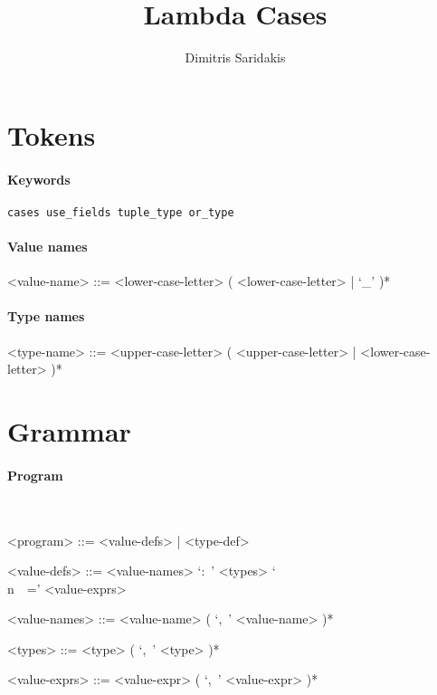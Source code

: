 \documentclass{article}
\date{}
\author{
  Dimitris Saridakis
}
\begin{document}
\title{
\textbf{Lambda Cases}
}
\maketitle

\section{Tokens}

\paragraph{Keywords}

\begin{verbatim}
cases use_fields tuple_type or_type
\end{verbatim}

\paragraph{Value names}

\begin{grammar}
<value-name> ::= 
<lower-case-letter> ( <lower-case-letter> | `_' )*
\end{grammar}

\paragraph{Type names}

\begin{grammar}
<type-name> ::= 
<upper-case-letter> ( <upper-case-letter> | <lower-case-letter> )*
\end{grammar}



\section{Grammar}

\setlength{\grammarparsep}{20pt}
\setlength{\grammarindent}{12em}

\paragraph{Program}
\hspace{1cm}\\
\begin{grammar}

<program> ::= <value-defs> | <type-def> 

<value-defs> ::= <value-names> `:\ ' <types> `\\n\ \ =' <value-exprs>

<value-names> ::= <value-name> ( `,\ ' <value-name> )*  

<types> ::= <type> ( `,\ ' <type> )*  

<value-exprs> ::= <value-expr> ( `,\ ' <value-expr> )*  

\end{grammar}
\hspace{1cm}\\
\end{document}
